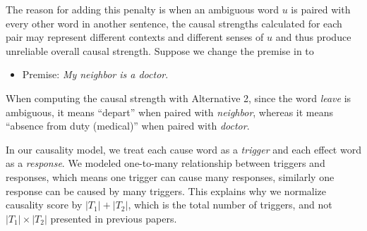



The reason for adding this penalty is when an ambiguous word $u$ is
paired with every other word in another sentence, the causal
strengths calculated for each pair may represent different contexts
and different senses of $u$ and thus produce unreliable overall
causal strength. Suppose we change the premise in 
to
\begin{itemize}
\item[] Premise: {\em My neighbor is a doctor}.
\end{itemize}
When computing the causal strength with Alternative 2, since the
word \emph{leave} is ambiguous, it means ``depart'' when paired with
\emph{neighbor}, whereas it means ``absence from duty (medical)''
when paired with \emph{doctor}.

In our causality model, we treat each cause word as a \emph{trigger}
and each effect word as a \emph{response}. We modeled one-to-many
relationship between triggers and responses, which means one trigger
can cause many responses, similarly one response can be caused by
many triggers. This explains why we normalize causality score by
$|T_1|+|T_2|$, which is the total number of triggers,
and not $|T_1|\times|T_2|$ presented in previous papers.

%



